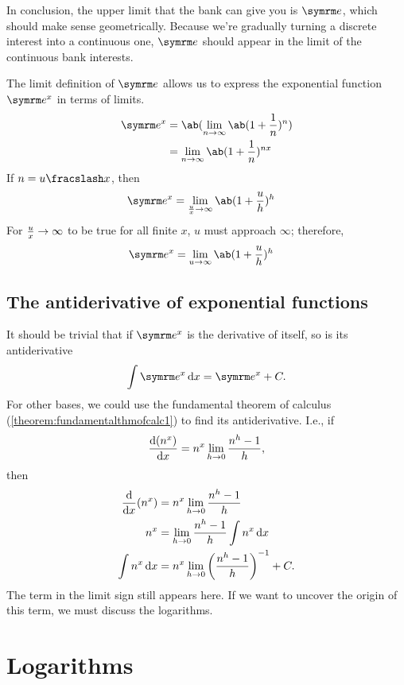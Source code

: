 In conclusion, the upper limit that the bank can give you is $\e$, which should make sense geometrically. Because we're gradually turning a discrete interest into a continuous one, $\e$ should appear in the limit of the continuous bank interests.

The limit definition of $\e$ allows us to express the exponential function $\e^x$ in terms of limits.
\begin{align}
	\e^x &= \ab(\lim_{n \appr \infty}\ab(1 + \frac{1}{n})^n) \\
		 &= \lim_{n \appr \infty}\ab(1 + \frac{1}{n})^{nx}
\end{align}
If $n = \flatfrac{u}{x}$, then
\begin{align}
	\e^x &= \lim_{\frac{u}{x} \appr \infty}\ab(1 + \frac{u}{h})^{h}
\end{align}
For $\frac{u}{x} \rightarrow \infty$ to be true for all finite $x$, $u$ must approach $\infty$; therefore,
\begin{align}
	\e^x &= \lim_{u \appr \infty}\ab(1 + \frac{u}{h})^h
\end{align}

\subsection{The antiderivative of exponential functions}

It should be trivial that if $\e^x$ is the derivative of itself, so is its antiderivative
\begin{equation}
    \int \e^x \odif{x} = \e^x + C.
\end{equation}
For other bases, we could use the fundamental theorem of calculus (\cref{theorem:fundamentalthmofcalc1}) to find its antiderivative. I.e., if
\begin{equation*}
    \odv{(n^x)}{x} = n^x\lim_{h \appr 0}\frac{n^h - 1}{h},
\end{equation*}
then
\begin{align*}
    \odv*{(n^x)}{x} &= n^x\lim_{h \appr 0}\frac{n^h - 1}{h} \\
    n^x &= \lim_{h \appr 0}\frac{n^h - 1}{h}\int n^x\odif{x} \\
    \int n^x\odif{x} &= n^x\lim_{h \appr 0}\left(\frac{n^h - 1}{h}\right)^{-1} + C.
\end{align*}
The term in the limit sign still appears here. If we want to uncover the origin of this term, we must discuss the logarithms.

\section{Logarithms}

